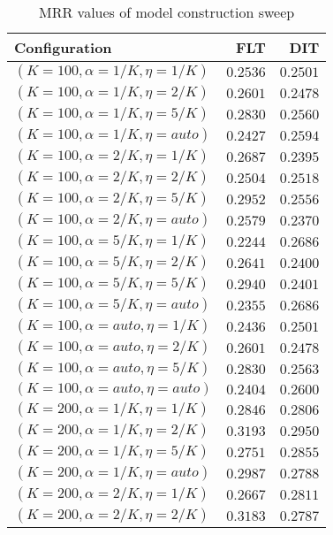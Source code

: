 
\begin{table}
\begin{spacing}{1.2}
\centering
\caption{MRR values of \mahout model construction sweep}
\label{table:mahout_model_sweep}
\vspace{0.2em}
\parbox{.45\linewidth}{\centering \begin{tabular}{lrr}
\toprule
                   Configuration &      FLT &      DIT \\
\midrule
   $(K=100,\alpha=1/K,\eta=1/K)$ & $0.2536$ & $0.2501$ \\
   $(K=100,\alpha=1/K,\eta=2/K)$ & $0.2601$ & $0.2478$ \\
   $(K=100,\alpha=1/K,\eta=5/K)$ & $0.2830$ & $0.2560$ \\
  $(K=100,\alpha=1/K,\eta=auto)$ & $0.2427$ & $0.2594$ \\
   $(K=100,\alpha=2/K,\eta=1/K)$ & $0.2687$ & $0.2395$ \\
   $(K=100,\alpha=2/K,\eta=2/K)$ & $0.2504$ & $0.2518$ \\
   $(K=100,\alpha=2/K,\eta=5/K)$ & $0.2952$ & $0.2556$ \\
  $(K=100,\alpha=2/K,\eta=auto)$ & $0.2579$ & $0.2370$ \\
   $(K=100,\alpha=5/K,\eta=1/K)$ & $0.2244$ & $0.2686$ \\
   $(K=100,\alpha=5/K,\eta=2/K)$ & $0.2641$ & $0.2400$ \\
   $(K=100,\alpha=5/K,\eta=5/K)$ & $0.2940$ & $0.2401$ \\
  $(K=100,\alpha=5/K,\eta=auto)$ & $0.2355$ & $0.2686$ \\
  $(K=100,\alpha=auto,\eta=1/K)$ & $0.2436$ & $0.2501$ \\
  $(K=100,\alpha=auto,\eta=2/K)$ & $0.2601$ & $0.2478$ \\
  $(K=100,\alpha=auto,\eta=5/K)$ & $0.2830$ & $0.2563$ \\
 $(K=100,\alpha=auto,\eta=auto)$ & $0.2404$ & $0.2600$ \\
   $(K=200,\alpha=1/K,\eta=1/K)$ & $0.2846$ & $0.2806$ \\
   $(K=200,\alpha=1/K,\eta=2/K)$ & $0.3193$ & $0.2950$ \\
   $(K=200,\alpha=1/K,\eta=5/K)$ & $0.2751$ & $0.2855$ \\
  $(K=200,\alpha=1/K,\eta=auto)$ & $0.2987$ & $0.2788$ \\
   $(K=200,\alpha=2/K,\eta=1/K)$ & $0.2667$ & $0.2811$ \\
   $(K=200,\alpha=2/K,\eta=2/K)$ & $0.3183$ & $0.2787$ \\

\end{tabular}}
\end{spacing}
\end{table}

